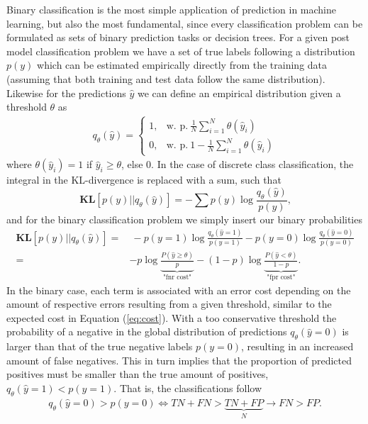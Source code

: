 \documentclass{article}
\begin{document}
Binary classification is the most simple application of prediction in machine learning, but also the most fundamental, since every classification problem can be formulated as sets of binary prediction tasks or decision trees. For a given post model classification problem we have a set of true labels following a distribution $p(y)$ which can be estimated empirically directly from the training data (assuming that both training and test data follow the same distribution). Likewise for the predictions $\hat{y}$ we can define an empirical distribution given a threshold $\theta$ as
\begin{align*}
    q_\theta(\hat{y}) = \begin{cases} 1, & \text{w. p.} \ \frac{1}{N}\sum_{i=1}^N \theta(\hat{y}_i) \\[0.2cm]
    0, &  \text{w. p.} \ 1 - \frac{1}{N}\sum_{i=1}^N \theta(\hat{y}_i) \end{cases}
\end{align*}
where $\theta(\hat{y}_i) = 1$ if $\hat{y}_i \geq \theta$, else 0.
In the case of discrete class classification, the integral in the KL-divergence is replaced with a sum, such that
\begin{equation}
\textbf{KL}[p(y) \vert\vert q_\theta(\hat{y})] = -\sum p(y) \log \frac{q_\theta(\hat{y})}{p(y)}\text{,}
\end{equation}
and for the binary classification problem we simply insert our binary probabilities
\begin{align}
\textbf{KL}[p(y) \vert\vert q_\theta(\hat{y})] = & \ - p(y=1) \log \frac{q_\theta(\hat{y}=1)}{p(y=1)} - p(y=0) \log \frac{q_\theta(\hat{y}=0)}{p(y=0)} \\ = & \label{eq:tprfpr} -p \log \underbrace{\frac{P(\hat{y}\geq \theta)}{p}}_\text{"fnr cost"} - (1-p) \log \underbrace{\frac{P(\hat{y} < \theta)}{1-p}}_\text{"fpr cost"} \text{.}
\end{align}
In the binary case, each term is associated with an error cost depending on the amount of respective errors resulting from a given threshold, similar to the expected cost in Equation (\ref{eq:cost}). With a too conservative threshold the probability of a negative in the global distribution of predictions $q_\theta (\hat{y}=0)$ is larger than that of the true negative labels $p(y=0)$, resulting in an increased amount of false negatives. This in turn implies that the proportion of predicted positives must be smaller than the true amount of positives, $q_\theta(\hat{y} = 1) < p(y=1)$. That is, the classifications follow
\begin{align*}
    q_\theta(\hat{y}=0) > p(y=0) \iff  TN + FN > \underbrace{TN+FP}_{N} \rightarrow FN>FP \text{.}
\end{align*}
\end{document}
